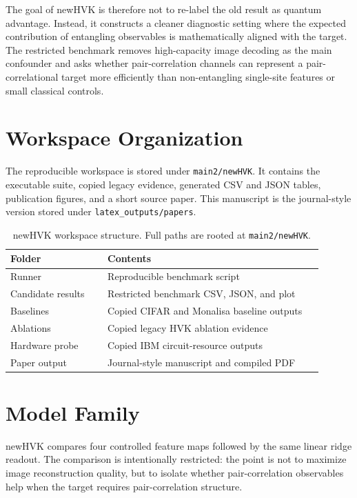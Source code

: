 \documentclass[journal]{IEEEtran}
\begin{document}
The goal of newHVK is therefore not to re-label the old result as quantum advantage. Instead, it constructs a cleaner diagnostic setting where the expected contribution of entangling observables is mathematically aligned with the target. The restricted benchmark removes high-capacity image decoding as the main confounder and asks whether pair-correlation channels can represent a pair-correlational target more efficiently than non-entangling single-site features or small classical controls.

\section{Workspace Organization}
The reproducible workspace is stored under \texttt{main2/newHVK}. It contains the executable suite, copied legacy evidence, generated CSV and JSON tables, publication figures, and a short source paper. This manuscript is the journal-style version stored under \texttt{latex\_outputs/papers}.

\begin{table}[t]
\centering
\caption{newHVK workspace structure. Full paths are rooted at \texttt{main2/newHVK}.}
\label{tab:workspace}
\scriptsize
\begin{tabular}{p{0.28\linewidth}p{0.62\linewidth}}
\toprule
Folder & Contents \\
\midrule
Runner & Reproducible benchmark script \\
Candidate results & Restricted benchmark CSV, JSON, and plot \\
Baselines & Copied CIFAR and Monalisa baseline outputs \\
Ablations & Copied legacy HVK ablation evidence \\
Hardware probe & Copied IBM circuit-resource outputs \\
Paper output & Journal-style manuscript and compiled PDF \\
\bottomrule
\end{tabular}
\end{table}

\section{Model Family}
newHVK compares four controlled feature maps followed by the same linear ridge readout. The comparison is intentionally restricted: the point is not to maximize image reconstruction quality, but to isolate whether pair-correlation observables help when the target requires pair-correlation structure.
\end{document}
